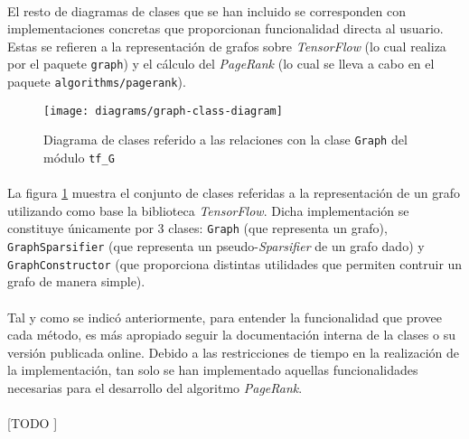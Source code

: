 \documentclass{subfiles}
\begin{document}
          \paragraph{}
          El resto de diagramas de clases que se han incluido se corresponden con implementaciones concretas que proporcionan funcionalidad directa al usuario. Estas se refieren a la representación de grafos sobre \emph{TensorFlow} (lo cual realiza por el paquete \texttt{graph}) y el cálculo del \emph{PageRank} (lo cual se lleva a cabo en el paquete \texttt{algorithms/pagerank}).

          \begin{figure}[h]
            \centering
            \texttt{[image: diagrams/graph-class-diagram]}
            \caption{Diagrama de clases referido a las relaciones con la clase \texttt{Graph} del módulo \texttt{tf\_G}}
            \label{img:graph_class_diagram}
          \end{figure}

          \paragraph{}
          La figura \ref{img:graph_class_diagram} muestra el conjunto de clases referidas a la representación de un grafo utilizando como base la biblioteca \emph{TensorFlow}. Dicha implementación se constituye únicamente por 3 clases: \texttt{Graph} (que representa un grafo), \texttt{GraphSparsifier} (que representa un pseudo-\emph{Sparsifier} de un grafo dado) y \texttt{GraphConstructor} (que proporciona distintas utilidades que permiten contruir un grafo de manera simple).

          \paragraph{}
          Tal y como se indicó anteriormente, para entender la funcionalidad que provee cada método, es más apropiado seguir la documentación interna de la clases o su versión publicada online. Debido a las restricciones de tiempo en la realización de la implementación, tan solo se han implementado aquellas funcionalidades necesarias para el desarrollo del algoritmo \emph{PageRank}.

          \paragraph{}
          [TODO ]
\end{document}
